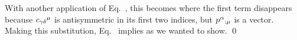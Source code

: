 {{	}
	With another application of Eq.~, this becomes
	where the first term disappears because $c_{\gamma \delta}{}^{\mu}$ is antisymmetric in its first two indices, but $p^{\alpha}{}_{; \mu}$ is a vector.  Making this substitution, Eq.~ implies
	as we wanted to show. \qed
}